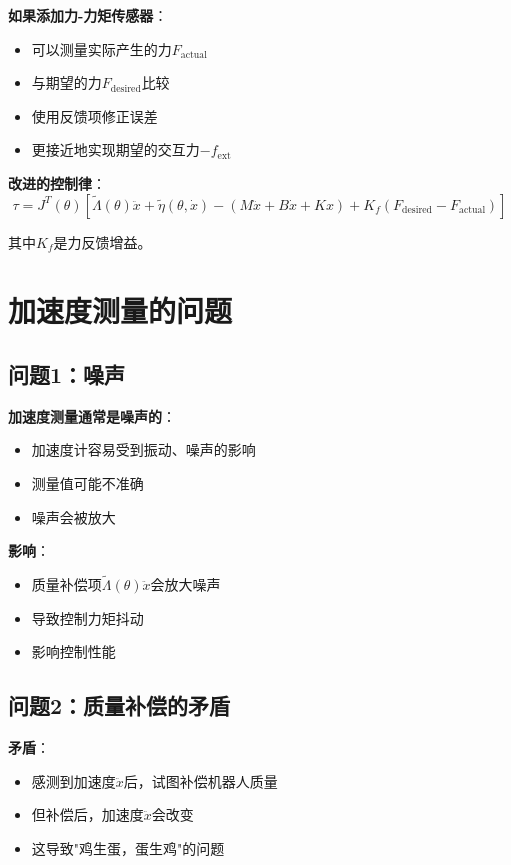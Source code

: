 \documentclass[12pt,a4paper]{article}
\begin{document}
\textbf{如果添加力-力矩传感器}：
\begin{itemize}
\item 可以测量实际产生的力$F_{\text{actual}}$
\item 与期望的力$F_{\text{desired}}$比较
\item 使用反馈项修正误差
\item 更接近地实现期望的交互力$-f_{\text{ext}}$
\end{itemize}

\textbf{改进的控制律}：
\begin{equation}
\tau = J^T(\theta)\left[\tilde{\Lambda}(\theta)\ddot{x} + \tilde{\eta}(\theta, \dot{x}) - (M\ddot{x} + B\dot{x} + Kx) + K_f(F_{\text{desired}} - F_{\text{actual}})\right]
\end{equation}

其中$K_f$是力反馈增益。

\section{加速度测量的问题}

\subsection{问题1：噪声}

\textbf{加速度测量通常是噪声的}：
\begin{itemize}
\item 加速度计容易受到振动、噪声的影响
\item 测量值可能不准确
\item 噪声会被放大
\end{itemize}

\textbf{影响}：
\begin{itemize}
\item 质量补偿项$\tilde{\Lambda}(\theta)\ddot{x}$会放大噪声
\item 导致控制力矩抖动
\item 影响控制性能
\end{itemize}

\subsection{问题2：质量补偿的矛盾}

\textbf{矛盾}：
\begin{itemize}
\item 感测到加速度$\ddot{x}$后，试图补偿机器人质量
\item 但补偿后，加速度$\ddot{x}$会改变
\item 这导致"鸡生蛋，蛋生鸡"的问题
\end{itemize}
\end{document}
